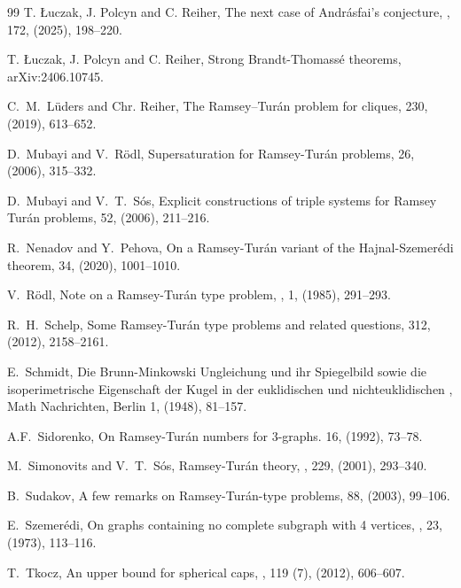 \documentclass[10pt,a4paper]{article}
\theoremstyle{definition}
\begin{document}
\begin{thebibliography}{99}
T. \L uczak, J. Polcyn and C. Reiher,
\newblock The next case of Andr\'asfai's conjecture, 
, 172, (2025), 198--220.

T. \L uczak, J. Polcyn and C. Reiher,
\newblock Strong Brandt-Thomass\'e theorems, 
\newblock arXiv:2406.10745.

C.~M.~L\"uders and Chr. Reiher,
\newblock The Ramsey–Tur\'an problem for cliques,
 230, (2019), 613--652.

D.~Mubayi and V.~R\"odl,
\newblock Supersaturation for Ramsey-Tur\'an problems,
 26, (2006), 315--332.

D.~Mubayi and V.~T.~S\'os,
\newblock Explicit constructions of triple systems for Ramsey Tur\'an problems,
 52, (2006), 211--216.

R.~Nenadov and Y.~Pehova,
\newblock On a Ramsey-Tur\'an variant of the Hajnal-Szemer\'edi theorem,
 34, (2020), 1001--1010.

V.~R\"odl,
\newblock Note on a Ramsey-Tur\'an type problem,
, 1, (1985), 291--293.

R.~H.~Schelp,
\newblock Some Ramsey-Tur\'an type problems and related questions,
 312, (2012), 2158--2161.

E.~Schmidt, 
\newblock Die Brunn-Minkowski Ungleichung und ihr Spiegelbild sowie die isoperimetrische Eigenschaft der Kugel in der euklidischen und nichteuklidischen
, Math Nachrichten, Berlin 1, (1948), 81--157.

A.F.~Sidorenko,
\newblock On Ramsey-Tur\'an numbers for $3$-graphs.
 16, (1992), 73--78.

M.~Simonovits and V.~T.~S\'os,
\newblock Ramsey-Tur\'an theory,
, 229, (2001), 293--340.

B.~Sudakov, 
\newblock A few remarks on Ramsey-Tur\'an-type problems, 
 88, (2003), 99--106.

E.~Szemer\'edi,
\newblock On graphs containing no complete subgraph with 4 vertices,
, 23, (1973), 113--116.

T.~Tkocz,
\newblock An upper bound for spherical caps,
, 119 (7), (2012), 606--607.

\end{thebibliography}
\end{document}
